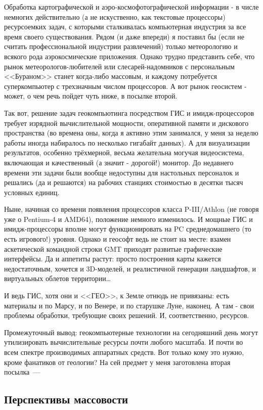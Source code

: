 Обработка картографической и аэро-космофотографической информации - в числе немногих действительно (а не искуственно, как текстовые процессоры) ресурсоемких задач, с которыми сталкивалась компьютерная индустрия за все время своего существования. Рядом (и даже впереди) я поставил бы (если не считать профессиональной индустрии развлечений) только метеорологию и всякого рода аэрокосмические приложения. Однако трудно представить себе, что рынок метеорологов-любителей или слесарей-надомников с персональным <<Бураном>> станет когда-либо массовым, и каждому потребуется суперкомпьютер с трехзначным числом процессоров. А вот рынок геосистем - может, о чем речь пойдет чуть ниже, в посылке второй.

Так вот, решение задач геокомпьютинга посредством ГИС и имидж-процессоров требует изрядной вычислительной мощности, оперативной памяти и дискового пространства (во времена оны, когда я активно этим занимался, у меня за неделю работы иногда набиралось по несколько гигабайт данных). А для визуализации результатов, особенно трёхмерной, весьма желательна могучая видеосистема, включающая и качественный (а значит - дорогой!) монитор. До недавнего времени эти задачи были вообще недоступны для настольных персоналок и решались (да и решаются) на рабочих станциях стоимостью в десятки тысяч условных единиц.

Ныне, начиная со времени появления процессоров класса \mbox{P-III/Athlon} (не говоря уже о Pentium-4 и AMD64), положение немного изменилось. И мощные ГИС и имидж-процессоры вполне могут функционировать на PC среднедомашнего (то есть игрового!) уровня. Однако и геософт ведь не стоит на месте: взамен аскетической командной строки GMT приходят развитые графические интерфейсы. Да и аппетиты растут: просто построения карты кажется недостаточным, хочется и 3D-моделей, и реалистичной генерации ландшафтов, и виртуальных облетов территории\dots

И ведь ГИС, хотя они и <<ГЕО>>, к Земле отнюдь не привязаны: есть материалы и по Марсу, и по Венере, и по старушке Луне, наконец. А там - свои проблемы обработки, требующие своих решений. И, соответственно, ресурсов.

Промежуточный вывод: геокомпьютерные технологии на сегодняшний день могут утилизировать вычислительные ресурсы почти любого масштаба. И почти во всем спектре производимых аппаратных средств. Вот только кому это нужно, кроме фанатиков от геологии? На сей предмет у меня заготовлена вторая посылка~---

\subsection{Перспективы массовости}

